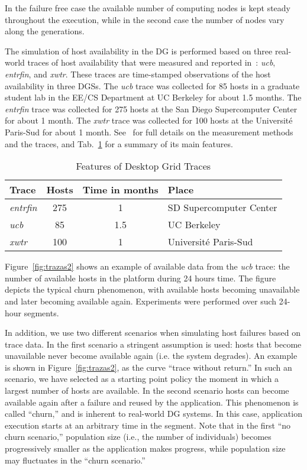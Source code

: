 \documentclass[graybox]{sty/svmult}
\begin{document}
In the failure free case the available number of computing nodes is kept steady throughout the execution, while in the second case the number of nodes vary along the generations.

The simulation of host availability in the DG is performed based
on three real-world traces of host availability that were measured
and reported in~\cite{traces-dgc}: \emph{ucb}, \emph{entrfin}, and
\emph{xwtr}. These traces are time-stamped observations of the host
availability in three DGSs.  The \emph{ucb} trace was collected for 85
hosts in a graduate student lab in the EE/CS Department at UC Berkeley
for about 1.5 months. The \emph{entrfin} trace was collected for 275 hosts
at the San Diego Supercomputer Center for about 1 month. The \emph{xwtr}
trace was collected for 100 hosts at the Universit\'e Paris-Sud for
about 1 month. See~\cite{traces-dgc} for full details on the measurement
methods and the traces, and Tab.~\ref{tab:traces-summary} for a summary of its main features.

\begin{table}[h]
    \center
    \caption{\label{tab:traces-summary}Features of Desktop Grid Traces}
    \begin{tabular}{|l|c|c|l|}
        \hline
        Trace & Hosts & Time in months & Place\\
        \hline
        \emph{entrfin} & 275 & 1 & SD Supercomputer Center \\
        \hline
        \emph{ucb} & 85 & 1.5  & UC Berkeley\\
        \hline
        \emph{xwtr} & 100 & 1 & Universit\'e Paris-Sud\\
        \hline
    \end{tabular}
\end{table}

Figure~\ref{fig:trazas2} shows an example of available data from the \emph{ucb}
trace: the number of available hosts in the platform during 24
hours time. The figure depicts the typical churn phenomenon, with available hosts
becoming unavailable and later becoming available again.  Experiments were performed over such 24-hour segments.

In addition, we use two different scenarios when simulating host failures based
on trace data. In the first scenario a stringent assumption is used: hosts
that become unavailable never become available again (i.e. the system degrades). An example  is shown in
Figure~\ref{fig:trazas2}, as the curve ``trace without return.''  In such an scenario, we have selected as a starting point policy the moment in which a largest number of hosts are available.  In the second scenario hosts can become available again after a
failure and
reused by the application. This phenomenon is called ``churn,'' and 
is inherent to real-world DG systems. In this case, application execution starts at an arbitrary time in
the segment.  Note that in the first ``no churn scenario,'' population
size (i.e., the number of individuals) becomes progressively smaller as the
application makes progress, while population size may fluctuates in the
``churn scenario.''
\end{document}
